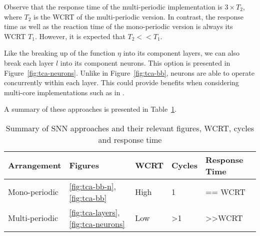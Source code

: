 Observe that the response time of the multi-periodic implementation is
$3 \times T_2$, where $T_2$ is the \ac{WCRT} of the multi-periodic
version. In contrast, the response time as well as the reaction time
of the mono-periodic version is always its \ac{WCRT} $T_1$. However, it is
expected that $T_2 << T_1$.

Like the breaking up of the function $\eta$ into its component
layers, we can also break each layer $l$ into its component neurons.
This option is presented in Figure~\ref{fig:tca-neurons}. 
Unlike in Figure~\ref{fig:tca-bb}, neurons are able to operate concurrently within each layer. 
This could provide benefits when considering multi-core
implementations such as in \cite{yuan2011compiling}.

A summary of these approaches is presented in Table~\ref{tbl:sann-approaches}.
\begin{table}[H]
	\centering
	\caption{Summary of \ac{SNN} approaches and their relevant figures, \ac{WCRT}, cycles and response time}
	\label{tbl:sann-approaches}
	\begin{tabular}{|l|l|l|l|l|}
		\hline
		Arrangement    & Figures & WCRT & Cycles & Response Time   \\ \hline
		Mono-periodic  & \ref{fig:tca-bb-n},\ref{fig:tca-bb} & High & 1 & == WCRT              \\
		Multi-periodic & \ref{fig:tca-layers},\ref{fig:tca-neurons}& Low  & \textgreater{}1 & \textgreater{}\textgreater{}WCRT \\ \hline
	\end{tabular}
\end{table}



